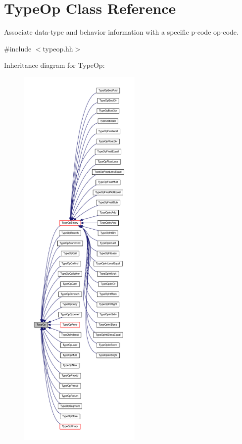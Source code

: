 \hypertarget{class_type_op}{}\section{Type\+Op Class Reference}
\label{class_type_op}


Associate data-\/type and behavior information with a specific p-\/code op-\/code.  




{\ttfamily \#include $<$typeop.\+hh$>$}



Inheritance diagram for Type\+Op\+:
\nopagebreak
\begin{figure}[H]
\begin{center}
\leavevmode
\includegraphics[height=550pt]{class_type_op__inherit__graph}
\end{center}
\end{figure}


